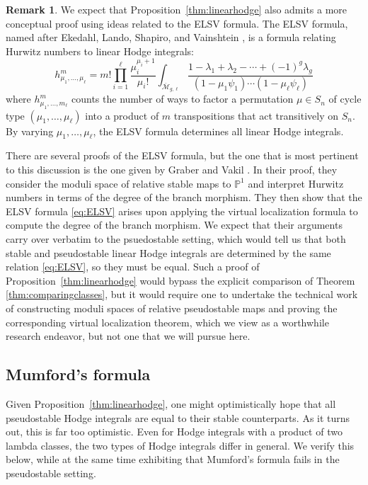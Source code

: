 \documentclass[12pt]{amsart}
\theoremstyle{definition}
\newtheorem{remark}[equation]{Remark}
\numberwithin{equation}{section}
\begin{document}
\begin{remark}\label{rmk:ELSV}
We expect that Proposition~\ref{thm:linearhodge} also admits a more conceptual proof using ideas related to the ELSV formula. The ELSV formula, named after Ekedahl, Lando, Shapiro, and Vainshtein \cite{ELSV}, is a formula relating Hurwitz numbers to linear Hodge integrals:
\begin{equation}\label{eq:ELSV}
h^m_{\mu_1,\dots,\mu_\ell}=m!\prod_{i=1}^\ell \frac{\mu_i^{\mu_i+1}}{\mu_i!}\int_{\mathcal{\overline{M}}_{g,\ell}}\frac{1-\lambda_1+\lambda_2-\cdots+(-1)^g\lambda_g}{(1-\mu_1\psi_1)\cdots(1-\mu_\ell\psi_\ell)}
\end{equation}
where $h^m_{\mu_1,\dots,m_\ell}$ counts the number of ways to factor a permutation $\mu\in S_n$ of cycle type $(\mu_1,\dots,\mu_\ell)$ into a product of $m$ transpositions that act transitively on $S_n$. By varying $\mu_1,\dots,\mu_\ell$, the ELSV formula determines all linear Hodge integrals.

There are several proofs of the ELSV formula, but the one that is most pertinent to this discussion is the one given by Graber and Vakil \cite{GP}. In their proof, they consider the moduli space of relative stable maps to $\mathbb{P}^1$ and interpret Hurwitz numbers in terms of the degree of the branch morphism. They then show that the ELSV formula \eqref{eq:ELSV} arises upon applying the virtual localization formula to compute the degree of the branch morphism. We expect that their arguments carry over verbatim to the psuedostable setting, which would tell us that both stable and pseudostable linear Hodge integrals are determined by the same relation \eqref{eq:ELSV}, so they must be equal. Such a proof of Proposition~\ref{thm:linearhodge} would bypass the explicit comparison of Theorem \ref{thm:comparingclasses}, but it would require one to undertake the technical work of constructing moduli spaces of relative pseudostable maps and proving the corresponding virtual localization theorem, which we view as a worthwhile research endeavor, but not one that we will pursue here.
\end{remark}


\subsection{Mumford's formula}

Given Proposition~\ref{thm:linearhodge}, one might optimistically hope that all pseudostable Hodge integrals are equal to their stable counterparts. As it turns out, this is far too optimistic. Even for Hodge integrals with a product of two lambda classes, the two types of Hodge integrals differ in general. We verify this below, while at the same time exhibiting that Mumford's formula fails in the pseudostable setting.
\end{document}
